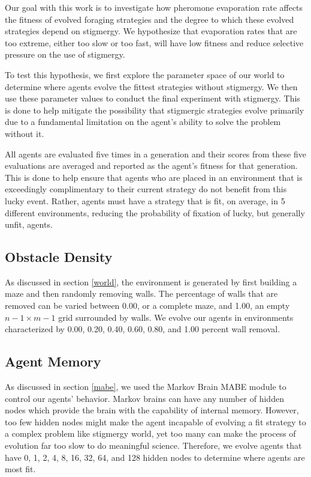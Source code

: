 Our goal with this work is to investigate how pheromone evaporation rate affects the fitness of evolved foraging strategies and the degree to which these evolved strategies depend on stigmergy. We hypothesize that evaporation rates that are too extreme, either too slow or too fast, will have low fitness and reduce selective pressure on the use of stigmergy.

To test this hypothesis, we first explore the parameter space of our world to determine where agents evolve the fittest strategies without stigmergy. We then use these parameter values to conduct the final experiment with stigmergy. This is done to help mitigate the possibility that stigmergic strategies evolve primarily due to a fundamental limitation on the agent's ability to solve the problem without it.

All agents are evaluated five times in a generation and their scores from these five evaluations are averaged and reported as the agent's fitness for that generation. This is done to help ensure that agents who are placed in an environment that is exceedingly complimentary to their current strategy do not benefit from this lucky event. Rather, agents must have a strategy that is fit, on average, in 5 different environments, reducing the probability of fixation of lucky, but generally unfit, agents.

\subsection*{Obstacle Density}

As discussed in section \ref{world}, the environment is generated by first building a maze and then randomly removing walls. The percentage of walls that are removed can be varied between 0.00, or a complete maze, and 1.00, an empty $n-1 \times m-1$ grid surrounded by walls. We evolve our agents in environments characterized by 0.00, 0.20, 0.40, 0.60, 0.80, and 1.00 percent wall removal.

\subsection*{Agent Memory}

As discussed in section \ref{mabe}, we used the Markov Brain MABE module to control our agents’ behavior. Markov brains can have any number of hidden nodes which provide the brain with the capability of internal memory. However, too few hidden nodes might make the agent incapable of evolving a fit strategy to a complex problem like stigmergy world, yet too many can make the process of evolution far too slow to do meaningful science. Therefore, we evolve agents that have 0, 1, 2, 4, 8, 16, 32, 64, and 128 hidden nodes to determine where agents are most fit.

